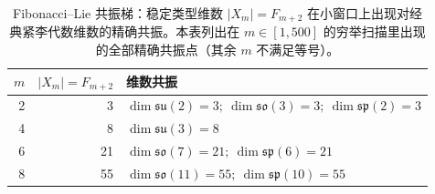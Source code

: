 \begin{table}[H]
\centering
\scriptsize
\setlength{\tabcolsep}{6pt}
\caption{Fibonacci--Lie 共振梯：稳定类型维数 $|X_m|=F_{m+2}$ 在小窗口上出现对经典紧李代数维数的精确共振。本表列出在 $m\in[1,500]$ 的穷举扫描里出现的全部精确共振点（其余 $m$ 不满足等号）。}
\label{tab:fibonacci_lie_resonance_ladder}
\begin{tabular}{r r l}
\toprule
$m$ & $|X_m|=F_{m+2}$ & 维数共振 \\
\midrule
2 & 3 & $\dim\mathfrak{su}(2)=3;\ \dim\mathfrak{so}(3)=3;\ \dim\mathfrak{sp}(2)=3$\\
4 & 8 & $\dim\mathfrak{su}(3)=8$\\
6 & 21 & $\dim\mathfrak{so}(7)=21;\ \dim\mathfrak{sp}(6)=21$\\
8 & 55 & $\dim\mathfrak{so}(11)=55;\ \dim\mathfrak{sp}(10)=55$\\
\bottomrule
\end{tabular}
\end{table}
